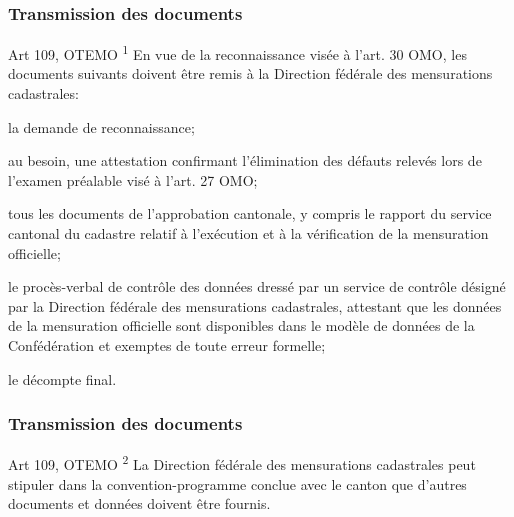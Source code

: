 \documentclass{beamer}
\renewcommand{\up}[1]{\textsuperscript{#1}}
\begin{document}
\begin{frame}
    \frametitle{Transmission des documents}
    \begin{alertblock}{Art 109, OTEMO}
        \up{1} \footnotesize En vue de la reconnaissance visée à l’art. 30 OMO, \alert{les documents suivants doivent être remis à la Direction fédérale des mensurations cadastrales}: \pause
        \begin{outline}
            \item la demande de reconnaissance; \pause
            \item au besoin, une attestation confirmant l’élimination des défauts relevés lors de l’examen préalable visé à l’art. 27 OMO; \pause
            \item tous les documents de l’approbation cantonale, y compris le rapport du service cantonal du cadastre relatif à l’exécution et à la vérification de la mensuration officielle; \pause
            \item le procès-verbal de contrôle des données dressé par un service de contrôle désigné par la Direction fédérale des mensurations cadastrales, attestant que les données de la mensuration officielle sont disponibles dans le modèle de données de la Confédération et exemptes de toute erreur formelle; \pause
            \item le décompte final.
        \end{outline}
    \end{alertblock}
\end{frame}

\begin{frame}
    \frametitle{Transmission des documents}
    \begin{alertblock}{Art 109, OTEMO}
        \up{2} La Direction fédérale des mensurations cadastrales peut stipuler dans la convention-programme conclue avec le canton que d’autres documents et données doivent être fournis.
    \end{alertblock}
\end{frame}
\end{document}
